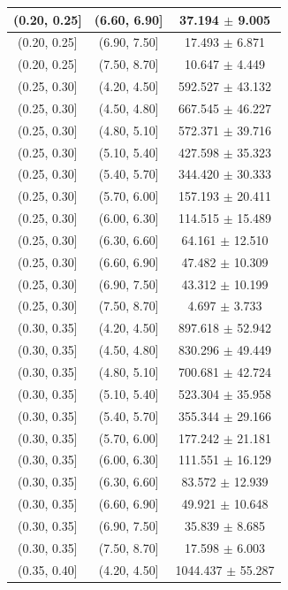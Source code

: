 \begin{longtable}{|c|c|c|}
\hline
(0.20, 0.25] & (6.60, 6.90] & 37.194 $\pm$ 9.005 \\ 
\hline
(0.20, 0.25] & (6.90, 7.50] & 17.493 $\pm$ 6.871 \\ 
\hline
(0.20, 0.25] & (7.50, 8.70] & 10.647 $\pm$ 4.449 \\ 
\hline
(0.25, 0.30] & (4.20, 4.50] & 592.527 $\pm$ 43.132 \\ 
\hline
(0.25, 0.30] & (4.50, 4.80] & 667.545 $\pm$ 46.227 \\ 
\hline
(0.25, 0.30] & (4.80, 5.10] & 572.371 $\pm$ 39.716 \\ 
\hline
(0.25, 0.30] & (5.10, 5.40] & 427.598 $\pm$ 35.323 \\ 
\hline
(0.25, 0.30] & (5.40, 5.70] & 344.420 $\pm$ 30.333 \\ 
\hline
(0.25, 0.30] & (5.70, 6.00] & 157.193 $\pm$ 20.411 \\ 
\hline
(0.25, 0.30] & (6.00, 6.30] & 114.515 $\pm$ 15.489 \\ 
\hline
(0.25, 0.30] & (6.30, 6.60] & 64.161 $\pm$ 12.510 \\ 
\hline
(0.25, 0.30] & (6.60, 6.90] & 47.482 $\pm$ 10.309 \\ 
\hline
(0.25, 0.30] & (6.90, 7.50] & 43.312 $\pm$ 10.199 \\ 
\hline
(0.25, 0.30] & (7.50, 8.70] & 4.697 $\pm$ 3.733 \\ 
\hline
(0.30, 0.35] & (4.20, 4.50] & 897.618 $\pm$ 52.942 \\ 
\hline
(0.30, 0.35] & (4.50, 4.80] & 830.296 $\pm$ 49.449 \\ 
\hline
(0.30, 0.35] & (4.80, 5.10] & 700.681 $\pm$ 42.724 \\ 
\hline
(0.30, 0.35] & (5.10, 5.40] & 523.304 $\pm$ 35.958 \\ 
\hline
(0.30, 0.35] & (5.40, 5.70] & 355.344 $\pm$ 29.166 \\ 
\hline
(0.30, 0.35] & (5.70, 6.00] & 177.242 $\pm$ 21.181 \\ 
\hline
(0.30, 0.35] & (6.00, 6.30] & 111.551 $\pm$ 16.129 \\ 
\hline
(0.30, 0.35] & (6.30, 6.60] & 83.572 $\pm$ 12.939 \\ 
\hline
(0.30, 0.35] & (6.60, 6.90] & 49.921 $\pm$ 10.648 \\ 
\hline
(0.30, 0.35] & (6.90, 7.50] & 35.839 $\pm$ 8.685 \\ 
\hline
(0.30, 0.35] & (7.50, 8.70] & 17.598 $\pm$ 6.003 \\ 
\hline
(0.35, 0.40] & (4.20, 4.50] & 1044.437 $\pm$ 55.287 \\ 

\end{longtable}
